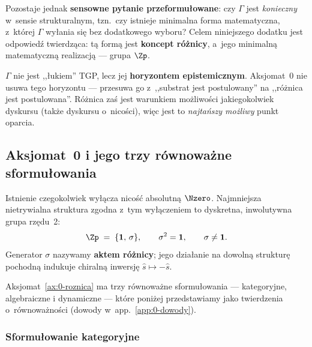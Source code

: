 Pozostaje jednak \textbf{sensowne pytanie przeformu\l{}owane}: czy
$\Gamma$ jest \emph{konieczny} w~sensie strukturalnym, tzn.~czy
istnieje minimalna forma matematyczna, z~kt\'orej $\Gamma$ wy\l{}ania
si\k{e} bez dodatkowego wyboru? Celem niniejszego dodatku jest
odpowied\'z twierdz\k{a}ca: t\k{a} form\k{a} jest \textbf{koncept
r\'o\.znicy}, a~jego minimaln\k{a} matematyczn\k{a} realizacj\k{a}
--- grupa $\Zp$.

\begin{remark}
\label{rem:0-horyzont}
$\Gamma$ nie jest ,,\l{}ukiem'' TGP, lecz jej \textbf{horyzontem
epistemicznym}. Aksjomat~0 nie usuwa tego horyzontu --- przesuwa go
z~,,substrat jest postulowany'' na ,,r\'o\.znica jest postulowana''.
R\'o\.znica zaś jest warunkiem mo\.zliwo\'sci jakiegokolwiek
dyskursu (tak\.ze dyskursu o~nicości), wi\k{e}c jest to
\emph{najtańszy mo\.zliwy} punkt oparcia.
\end{remark}

\subsection{Aksjomat~0 i jego trzy r\'ownowa\.zne sformu\l{}owania}%
\label{app:0-aksjomat}

\begin{axiom}\label{ax:0-roznica}
Istnienie czegokolwiek wy\l{}\k{a}cza nicość absolutn\k{a} $\Nzero$.
Najmniejsza nietrywialna struktura zgodna z~tym wy\l{}\k{a}czeniem
to dyskretna, inwolutywna grupa rz\k{e}du~2:
\[
  \Zp \;=\; \{\mathbf{1},\,\sigma\},
  \qquad \sigma^2 = \mathbf{1},
  \qquad \sigma \neq \mathbf{1}.
\]
Generator $\sigma$ nazywamy \textbf{aktem r\'o\.znicy}; jego
dzia\l{}anie na dowoln\k{a} struktur\k{e} pochodn\k{a} indukuje
chiraln\k{a} inwersj\k{e} $\hat{s} \mapsto -\hat{s}$.
\end{axiom}

Aksjomat~\ref{ax:0-roznica} ma trzy r\'ownowa\.zne sformu\l{}owania
--- kategoryjne, algebraiczne i dynamiczne --- kt\'ore poni\.zej
przedstawiamy jako twierdzenia o~r\'ownowa\.zności (dowody w~app.~\ref{app:0-dowody}).

\subsubsection{Sformu\l{}owanie kategoryjne}%
\label{app:0-kategoryjne}

